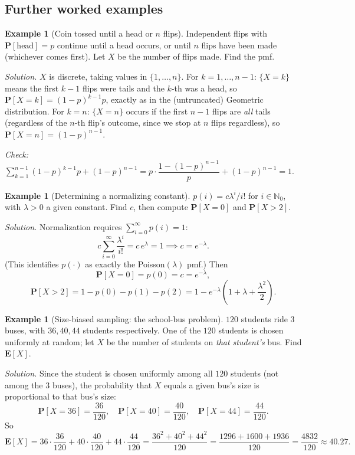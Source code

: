 \documentclass[11pt]{article}
\theoremstyle{definition}
\newtheorem{example}[definition]{Example}
\theoremstyle{plain}
\theoremstyle{remark}
\newcommand{\E}[1]{\mathbf{E}\!\left[#1\right]}
\newcommand{\Nz}{\mathbb{N}_0}
\begin{document}
\subsection{Further worked examples}

\begin{example}[Coin tossed until a head or $n$ flips]
Independent flips with $\mathbf{P}[\text{head}]=p$ continue until a head occurs, or until $n$
flips have been made (whichever comes first). Let $X$ be the number of flips made. Find the pmf.

\emph{Solution.} $X$ is discrete, taking values in $\{1,\dots,n\}$. For $k=1,\dots,n-1$:
$\{X=k\}$ means the first $k-1$ flips were tails and the $k$-th was a head, so
$\mathbf{P}[X=k]=(1-p)^{k-1}p$, exactly as in the (untruncated) Geometric distribution. For $k=n$:
$\{X=n\}$ occurs if the first $n-1$ flips are \emph{all} tails (regardless of the $n$-th flip's
outcome, since we stop at $n$ flips regardless), so $\mathbf{P}[X=n]=(1-p)^{n-1}$.

\emph{Check:} $\sum_{k=1}^{n-1}(1-p)^{k-1}p + (1-p)^{n-1}
= p\cdot\dfrac{1-(1-p)^{n-1}}{p} + (1-p)^{n-1} = 1$. \checkmark
\end{example}

\begin{example}[Determining a normalizing constant]
$p(i) = c\lambda^i/i!$ for $i \in \Nz$, with $\lambda>0$ a given constant. Find $c$, then compute
$\mathbf{P}[X=0]$ and $\mathbf{P}[X>2]$.

\emph{Solution.} Normalization requires $\sum_{i=0}^\infty p(i)=1$:
\[
c\sum_{i=0}^\infty \frac{\lambda^i}{i!} = c\,e^{\lambda} = 1 \implies c = e^{-\lambda}.
\]
(This identifies $p(\cdot)$ as exactly the Poisson$(\lambda)$ pmf.) Then
\[
\mathbf{P}[X=0] = p(0) = c = e^{-\lambda},
\]
\[
\mathbf{P}[X>2] = 1-p(0)-p(1)-p(2) = 1 - e^{-\lambda}\left(1+\lambda+\frac{\lambda^2}{2}\right).
\]
\end{example}

\begin{example}[Size-biased sampling: the school-bus problem]
$120$ students ride $3$ buses, with $36, 40, 44$ students respectively. One of the $120$ students
is chosen uniformly at random; let $X$ be the number of students on \emph{that student's} bus.
Find $\E{X}$.

\emph{Solution.} Since the student is chosen uniformly among all $120$ students (not among the $3$
buses), the probability that $X$ equals a given bus's size is proportional to that bus's size:
\[
\mathbf{P}[X=36]=\frac{36}{120}, \quad \mathbf{P}[X=40]=\frac{40}{120}, \quad \mathbf{P}[X=44]=\frac{44}{120}.
\]
So
\[
\E{X} = 36\cdot\frac{36}{120} + 40\cdot\frac{40}{120} + 44\cdot\frac{44}{120}
= \frac{36^2+40^2+44^2}{120} = \frac{1296+1600+1936}{120} = \frac{4832}{120} \approx \boxed{40.27}.
\]
\end{example}
\end{document}
